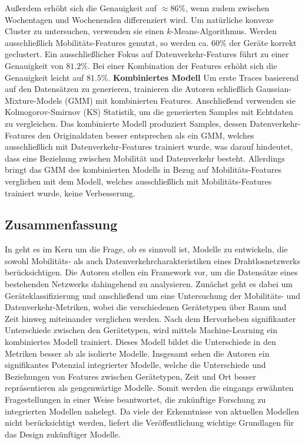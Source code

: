 \documentclass[12pt, a4paper]{article}
\begin{document}
Außerdem erhöht sich die Genauigkeit auf $\approx 86 \%$, wenn zudem zwischen Wochentagen und Wochenenden differenziert wird.
Um natürliche konvexe Cluster zu untersuchen, verwenden sie einen $k$-Means-Algorithmus.
Werden ausschließlich Mobilitäts-Features genutzt, so werden ca. $60 \%$ der Geräte korrekt geclustert.
Ein ausschließlicher Fokus auf Datenverkehr-Features führt zu einer Genauigkeit von $81.2 \%$.
Bei einer Kombination der Features erhöht sich die Genauigkeit leicht auf $81.5 \%$.
\newline\newline\newline
\textbf{Kombiniertes Modell}
\newline\newline
Um erste Traces basierend auf den Datensätzen zu generieren, trainieren die Autoren schließlich Gaussian-Mixture-Models (GMM) mit
kombinierten Features. Anschließend verwenden sie Kolmogorov-Smirnov (KS) Statistik, um die generierten
Samples mit Echtdaten zu vergleichen. Das kombinierte Modell produziert Samples, dessen Datenverkehr-Features
den Originaldaten besser entsprechen als ein GMM, welches ausschließlich mit Datenverkehr-Features trainiert wurde,
was darauf hindeutet, dass eine Beziehung zwischen Mobilität und Datenverkehr besteht. \cite{Alipour2018}
Allerdings bringt das GMM des kombinierten Modells in Bezug auf Mobilitäts-Features verglichen mit
dem Modell, welches ausschließlich mit Mobilitäts-Features trainiert wurde, keine Verbesserung.

\subsection{Zusammenfassung}
\label{sec:summary}

In \cite{Alipour2018} geht es im Kern um die Frage, ob es sinnvoll ist, Modelle zu entwickeln, die sowohl
Mobilitäts- als auch Datenverkehrcharakteristiken eines Drahtlosnetzwerks berücksichtigen.
Die Autoren stellen ein Framework vor, um die Datensätze eines bestehenden Netzwerks dahingehend zu analysieren.
Zunächst geht es dabei um Geräteklassifizierung und anschließend um eine Untersuchung der Mobilitäts-
und Datenverkehr-Metriken, wobei die verschiedenen Gerätetypen über Raum und Zeit hinweg miteinander verglichen werden.
Nach dem Hervorheben signifikanter Unterschiede zwischen den Gerätetypen, wird mittels Machine-Learning ein kombiniertes Modell
trainiert. Dieses Modell bildet die Unterschiede in den Metriken besser ab als isolierte Modelle.
Insgesamt sehen die Autoren ein signifikantes Potenzial integrierter Modelle, welche die Unterschiede und Beziehungen 
von Features zwischen Gerätetypen, Zeit und Ort besser repräsentieren als gengenwärtige Modelle. 
Somit werden die eingangs erwähnten Fragestellungen in einer Weise beantwortet, die zukünftige Forschung zu
integrierten Modellen nahelegt. Da viele der Erkenntnisse von aktuellen Modellen nicht berücksichtigt werden, 
liefert die Veröffentlichung wichtige Grundlagen für das Design zukünftiger Modelle.
\end{document}
